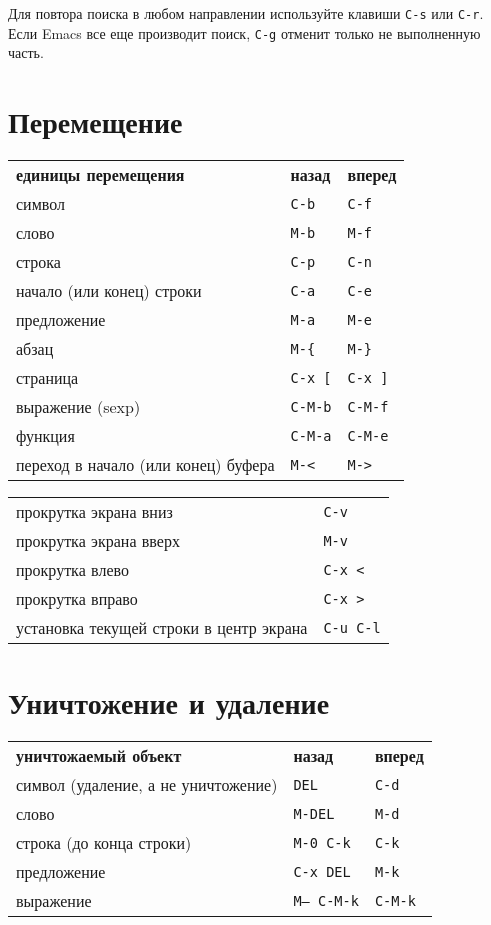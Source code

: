\documentclass[10pt]{article}
\newlength{\ColWidth}
\newlength{\ColThreeWidth}
\newcommand{\kbd}[1]{\texttt{#1}}
\begin{document}
Для повтора поиска в любом направлении используйте клавиши \kbd{C-s} или
\kbd{C-r}. Если Emacs все еще производит поиск, \kbd{C-g} отменит только
не выполненную часть.

\section{Перемещение}

\begin{tabular}{p{\ColWidth}p{\ColThreeWidth}p{\ColThreeWidth}}
{\bf единицы перемещения} & {\bf назад} & {\bf вперед} \\
символ & \kbd{C-b} & \kbd{C-f} \\
слово & \kbd{M-b} & \kbd{M-f} \\
строка & \kbd{C-p} & \kbd{C-n} \\
начало (или конец) строки & \kbd{C-a} & \kbd{C-e} \\
предложение & \kbd{M-a} & \kbd{M-e} \\
абзац & \kbd{M-\{} & \kbd{M-\}} \\
страница & \kbd{C-x [} & \kbd{C-x ]} \\
выражение (sexp) & \kbd{C-M-b} & \kbd{C-M-f} \\
функция & \kbd{C-M-a} & \kbd{C-M-e} \\
переход в начало (или конец) буфера & \kbd{M-<} & \kbd{M->} \\

\end{tabular}

\begin{tabular}{p{\ColWidth}l}
прокрутка экрана вниз & \kbd{C-v} \\
прокрутка экрана вверх & \kbd{M-v} \\
прокрутка влево & \kbd{C-x <} \\
прокрутка вправо & \kbd{C-x >} \\
установка текущей строки в центр экрана & \kbd{C-u C-l} \\
\end{tabular}

\section{Уничтожение и удаление}

\begin{tabular}{p{\ColWidth}p{\ColThreeWidth}p{\ColThreeWidth}}
{\bf уничтожаемый объект} & {\bf назад} & {\bf вперед} \\
символ (удаление, а не уничтожение) & \kbd{DEL} & \kbd{C-d} \\
слово & \kbd{M-DEL} & \kbd{M-d} \\
строка (до конца строки) & \kbd{M-0 C-k} & \kbd{C-k} \\
предложение & \kbd{C-x DEL} & \kbd{M-k} \\
выражение & \kbd{M-- C-M-k} & \kbd{C-M-k} \\
\end{tabular}
\end{document}
